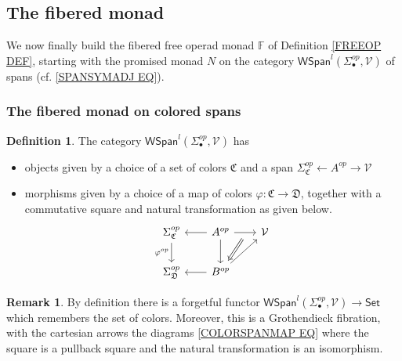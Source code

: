\documentclass[a4paper,10pt
,draft
]{article}%
\numberwithin{equation}{section}
\numberwithin{figure}{section}
\theoremstyle{definition} %
\newtheorem{definition}[equation]{Definition}%
\newtheorem{remark}[equation]{Remark}%
\newcommand{\1}{\ensuremath{\mathbbm 1}}%
\begin{document}
\subsection{The fibered monad} \label{NONEQMON SEC}

We now finally build the fibered free operad monad
$\mathbb{F}$ of Definition \ref{FREEOP DEF},
starting with the promised monad $N$ on the category $\mathsf{WSpan}^l(\Sigma_{\bullet}^{op},\mathcal{V})$ of spans
(cf. \eqref{SPANSYMADJ EQ}).


\subsubsection*{The fibered monad on colored spans}



\begin{definition}
The category $\mathsf{WSpan}^l(\Sigma_{\bullet}^{op},\mathcal{V})$ has
\begin{itemize}
\item objects given by a choice of a set of colors $\mathfrak{C}$
and a span $\Sigma^{op}_{\mathfrak{C}} \leftarrow A^{op} \rightarrow \mathcal{V}$
\item morphisms given by a choice of a map of colors
$\varphi \colon \mathfrak{C} \to \mathfrak{D}$,
together with a commutative square and natural transformation as given below.
\begin{equation}\label{COLORSPANMAP EQ}
\begin{tikzcd}[column sep = 20pt]
	\Sigma_{\mathfrak{C}}^{op}
		\ar{d}[swap]{\varphi^{op}} &
	A^{op}
		\ar{r}[name=U,swap]{} \ar{d} \ar{l} &
	\mathcal{V}	
\\
	\Sigma_{\mathfrak{D}}^{op}
		&
	|[alias=V]|
	B^{op} \ar{l}
		\ar{ru}
\arrow[Leftarrow, from=V, to=U,shorten >=0.05cm,shorten <=0.1cm]
\end{tikzcd}
\end{equation}
\end{itemize}
\end{definition}



\begin{remark}
By definition there is a forgetful functor
$\mathsf{WSpan}^l(\Sigma_{\bullet}^{op},\mathcal{V}) \to \mathsf{Set}$
which remembers the set of colors.
Moreover, this is a Grothendieck fibration, with the cartesian arrows the diagrams \eqref{COLORSPANMAP EQ} where the square is a pullback square and the natural transformation is an isomorphism.
\end{remark}
\end{document}
